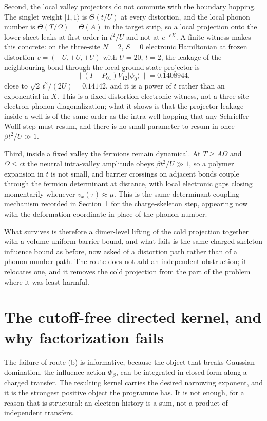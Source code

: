 \documentclass[11pt]{article}
\theoremstyle{definition}
\theoremstyle{remark}
\begin{document}
Second, the local valley projectors do not commute with the boundary hopping. The
singlet weight $|1,1\rangle$ is $\Theta(t/U)$ at every distortion, and the local
phonon number is $\Theta(T/\Omega)=\Theta(A)$ in the target strip, so a local
projection onto the lower sheet leaks at first order in $t^{2}/U$ and not at
$e^{-cX}$. A finite witness makes this concrete: on the three-site $N=2$, $S=0$
electronic Hamiltonian at frozen distortion $v=(-U,+U,+U)$ with $U=20$, $t=2$, the
leakage of the neighbouring bond through the local ground-state projector is
\begin{equation}
\bigl\|(I-P_{01})V_{12}|\psi_{0}\rangle\bigr\|=0.1408944 ,
\label{eq:leak}
\end{equation}
close to $\sqrt{2}\,t^{2}/(2U)=0.14142$, and it is a power of $t$ rather than an
exponential in $X$. This is a fixed-distortion electronic witness, not a
three-site electron-phonon diagonalization; what it shows is that the projector
leakage inside a well is of the same order as the intra-well hopping that any
Schrieffer-Wolff step must resum, and there is no small parameter to resum in once
$\beta t^{2}/U\gg1$.

Third, inside a fixed valley the fermions remain dynamical. At $T\ge A\Omega$ and
$\Omega\le ct$ the neutral intra-valley amplitude obeys $\beta t^{2}/U\gg1$, so a
polymer expansion in $t$ is not small, and barrier crossings on adjacent bonds
couple through the fermion determinant at distance, with local electronic gaps
closing momentarily whenever $v_{x}(\tau)\approx\mu$. This is the same
determinant-coupling mechanism recorded in Section~\ref{sec:kernel} for the
charge-skeleton step, appearing now with the deformation coordinate in place of
the phonon number.

What survives is therefore a dimer-level lifting of the cold projection together
with a volume-uniform barrier bound, and what fails is the same
charged-skeleton influence bound as before, now asked of a distortion path rather
than of a phonon-number path. The route does not add an independent obstruction;
it relocates one, and it removes the cold projection from the part of the problem
where it was least harmful.

\section{The cutoff-free directed kernel, and why factorization fails}
\label{sec:kernel}

The failure of route (b) is informative, because the object that breaks
Gaussian domination, the influence action $\Phi_{\beta}$, can be integrated in
closed form along a charged transfer. The resulting kernel carries the desired
narrowing exponent, and it is the strongest positive object the programme has. It
is not enough, for a reason that is structural: an electron history is a sum, not
a product of independent transfers.
\end{document}
